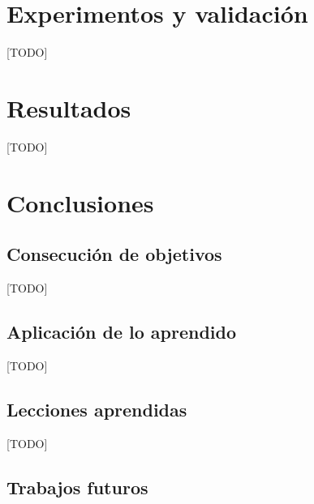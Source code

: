\documentclass[a4paper, 12pt]{book}
\begin{document}
\cleardoublepage
\chapter{Experimentos y validación}

[TODO]



\cleardoublepage
\chapter{Resultados}

[TODO]



\cleardoublepage
\chapter{Conclusiones}
\label{chap:conclusiones}


\section{Consecución de objetivos}
\label{sec:consecucion-objetivos}

[TODO]

\section{Aplicación de lo aprendido}
\label{sec:aplicacion}

[TODO]

\section{Lecciones aprendidas}
\label{sec:lecciones_aprendidas}

[TODO]

\section{Trabajos futuros}
\label{sec:trabajos_futuros}
\end{document}
